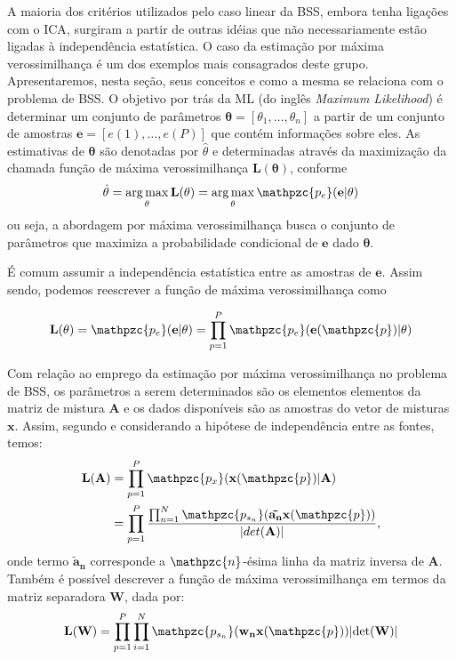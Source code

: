     A maioria dos critérios utilizados pelo caso linear da BSS, embora tenha ligações com o ICA, surgiram a partir de outras idéias que não necessariamente estão ligadas à independência estatística. O caso da estimação por máxima verossimilhança é um dos exemplos mais consagrados deste grupo. Apresentaremos, nesta seção, seus conceitos e como a mesma se relaciona com o problema de BSS. 
    O objetivo por trás da ML (do inglês \textit{Maximum Likelihood}) é determinar um conjunto de parâmetros $\mathbf{\theta} = [\theta_1, \dots, \theta_n]$ a partir de um conjunto de amostras $\mathbf{e} = [e(1), \dots, e(P)]$ que contém informações sobre eles. As estimativas de $\mathbf{\theta}$ são denotadas por $\hat{\theta}$ e determinadas através da maximização da chamada função de máxima verossimilhança $\mathbf{L(\theta)}$, conforme    
    \begin{equation}\label{eq:argmax}
    \hat{\theta} = \operatorname*{arg\,max}_{\theta} \mathbf{L(\theta)}
    = \operatorname*{arg\,max}_{\theta}
    \mathpzc{p_e}(\mathbf{e} | \mathbf{\theta})
    \end{equation} ou seja, a abordagem por máxima verossimilhança busca o conjunto de parâmetros que maximiza a probabilidade condicional de $\mathbf{e}$ dado $\mathbf{\theta}$.
    
    É comum assumir a independência estatística entre as amostras de $\mathbf{e}$. Assim sendo, podemos reescrever a função de máxima verossimilhança como
    
    \begin{equation}\label{eq:argmax2}
        \mathbf{L(\theta)}
        =\mathpzc{p_e}(\mathbf{e} | \mathbf{\theta})
        =\prod_{p=1}^P \mathpzc{p_e}(\mathbf{e}(\mathpzc{p}) | \mathbf{\theta})
    \end{equation}

    Com relação ao emprego da estimação por máxima verossimilhança no problema de BSS, os parâmetros a serem determinados são os elementos elementos da matriz de mistura $\mathbf{A}$ e os dados disponíveis são as amostras do vetor de misturas $\mathbf{x}$. Assim, segundo \cite{cetrallimit} e considerando a hipótese de independência entre as fontes, temos:
        \begin{equation}\label{eq:verobss}
          \begin{split}
         \mathbf{L(A)} & =\prod_{p=1}^P \mathpzc{p_x}(\mathbf{x}(\mathpzc{p}) | \mathbf{A})\\
                                & =\prod_{p=1}^P\frac{\prod_{n=1}^N\mathpzc{p_{s_n}}(\mathbf{\tilde{a_n}}\mathbf{x}(\mathpzc{p}))}{| det(\mathbf{A}) |},
        \end{split}
    \end{equation} 
    onde termo $\mathbf{\tilde{a}_n}$ corresponde a $\mathpzc{n}$-ésima linha da matriz inversa de $\mathbf{A}$. Também é possível descrever a função de máxima verossimilhança em termos da matriz separadora $\mathbf{W}$, dada por:
    \begin{equation}
        \label{eq:veroForW}
        \mathbf{L(W)} = \prod_{p=1}^{P}\prod_{i=1}^N\mathpzc{p_{s_n}}(\mathbf{w_nx}(\mathpzc{p}))|\text{det}(\mathbf{W})|
    \end{equation}
  
